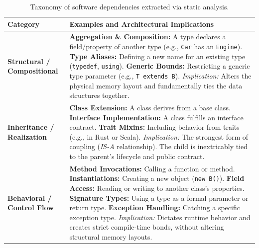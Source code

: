 \begin{table}[ht]
  \small
  \centering
  \renewcommand{\arraystretch}{1.5}
  \begin{tabularx}{\textwidth}{|L{0.2\textwidth}|X|}
    \hline
    \textbf{Category} & \textbf{Examples and Architectural Implications} \\
    \hline
    \textbf{Structural / Compositional} & \textbf{Aggregation \&
    Composition:} A type declares a field/property of another type
    (e.g., \texttt{Car} has an \texttt{Engine}).\newline
    \textbf{Type Aliases:} Defining a new name for an existing type
    (\texttt{typedef}, \texttt{using}).\newline
    \textbf{Generic Bounds:} Restricting a generic type parameter
    (e.g., \texttt{T extends B}).\newline
    \textit{Implication:} Alters the physical memory layout and
    fundamentally ties the data structures together. \\
    \hline
    \textbf{Inheritance / Realization} & \textbf{Class Extension:} A
    class derives from a base class.\newline
    \textbf{Interface Implementation:} A class fulfills an interface
    contract.\newline
    \textbf{Trait Mixins:} Including behavior from traits (e.g., in
    Rust or Scala).\newline
    \textit{Implication:} The strongest form of coupling
    (\textit{IS-A} relationship). The child is inextricably tied to
    the parent's lifecycle and public contract. \\
    \hline
    \textbf{Behavioral / Control Flow} & \textbf{Method Invocations:}
    Calling a function or method.\newline
    \textbf{Instantiations:} Creating a new object (\texttt{new B()}).\newline
    \textbf{Field Access:} Reading or writing to another class's
    properties.\newline
    \textbf{Signature Types:} Using a type as a formal parameter or
    return type.\newline
    \textbf{Exception Handling:} Catching a specific exception type.\newline
    \textit{Implication:} Dictates runtime behavior and creates
    strict compile-time bonds, without altering structural memory layouts. \\
    \hline
  \end{tabularx}
  \caption{Taxonomy of software dependencies extracted via static analysis.}
  \label{tab:dependency_types}
\end{table}

